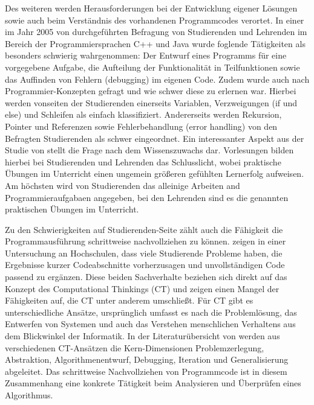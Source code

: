 Des weiteren werden Herausforderungen bei der Entwicklung eigener Lösungen sowie auch beim Verständnis des vorhandenen Programmcodes verortet. In einer im Jahr 2005 von \textcite[S.~15-16]{Lahtinen2005Difficulties} durchgeführten Befragung von Studierenden und Lehrenden im Bereich der Programmiersprachen C++ und Java wurde foglende Tätigkeiten als besonders schwierig wahrgenommen: Der Entwurf eines Programms für eine vorgegebene Aufgabe, die Aufteilung der Funktionalität in Teilfunktionen sowie das Auffinden von Fehlern (debugging) im eigenen Code. Zudem wurde auch nach Programmier-Konzepten gefragt und wie schwer diese zu erlernen war. Hierbei werden vonseiten der Studierenden einerseits Variablen, Verzweigungen (if und else) und Schleifen als einfach klassifiziert. Andererseits werden Rekursion, Pointer und Referenzen sowie Fehlerbehandlung (error handling) von den Befragten Studierenden als schwer eingeordnet. Ein interessanter Aspekt aus der Studie von \textcite[S.~16]{Lahtinen2005Difficulties} stellt die Frage nach dem Wissenszuwachs dar. Vorlesungen bilden hierbei bei Studierenden und Lehrenden das Schlusslicht, wobei praktische Übungen im Unterricht einen ungemein größeren gefühlten Lernerfolg aufweisen. Am höchsten wird von Studierenden das alleinige Arbeiten and Programmieraufgabaen angegeben, bei den Lehrenden sind es die genannten praktischen Übungen im Unterricht.

Zu den Schwierigkeiten auf Studierenden-Seite zählt auch die Fähigkeit die Programmausführung schrittweise nachvollziehen zu können. \textcite[S.~119-121]{lister_multi-national_2004} zeigen in einer Untersuchung an Hochschulen, dass viele Studierende Probleme haben, die Ergebnisse kurzer Codeabschnitte vorherzusagen und unvollständigen Code passend zu ergänzen. Diese beiden Sachverhalte beziehen sich direkt auf das Konzept des Computational Thinkings (CT) und zeigen einen Mangel der Fähigkeiten auf, die CT unter anderem umschließt. Für CT gibt es unterschiedliche Ansätze, ursprünglich umfasst es nach \textcite[S.~33-34]{wing_computational_2006} die Problemlösung, das Entwerfen von Systemen und auch das Verstehen menschlichen Verhaltens aus dem Blickwinkel der Informatik. In der Literaturübersicht von \textcite{shute_demystifying_2017} werden aus verschiedenen CT-Ansätzen die Kern-Dimensionen Problemzerlegung, Abstraktion, Algorithmenentwurf, Debugging, Iteration und Generalisierung abgeleitet. Das schrittweise Nachvollziehen von Programmcode ist in diesem Zusammenhang eine konkrete Tätigkeit beim Analysieren und Überprüfen eines Algorithmus.

